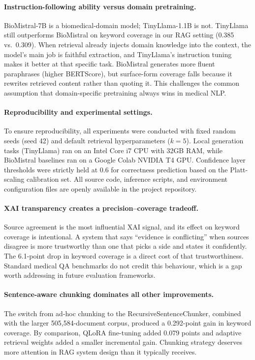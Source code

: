 \documentclass[conference,a4paper]{IEEEtran}
\begin{document}
\paragraph{Instruction-following ability versus domain pretraining.}
BioMistral-7B is a biomedical-domain model; TinyLlama-1.1B is not.
TinyLlama still outperforms BioMistral on keyword coverage in our RAG
setting (0.385 vs.\ 0.309).
When retrieval already injects domain knowledge into the context, the
model's main job is faithful extraction, and TinyLlama's instruction
tuning makes it better at that specific task.
BioMistral generates more fluent paraphrases (higher BERTScore), but
surface-form coverage falls because it rewrites retrieved content rather
than quoting it.
This challenges the common assumption that domain-specific pretraining
always wins in medical NLP.

\paragraph{Reproducibility and experimental settings.}
To ensure reproducibility, all experiments were conducted with fixed
random seeds (seed 42) and default retrieval hyperparameters ($k=5$).
Local generation tasks (TinyLlama) ran on an Intel Core i7 CPU with 32GB
RAM, while BioMistral baselines ran on a Google Colab NVIDIA T4 GPU.
Confidence layer thresholds were strictly held at 0.6 for correctness
prediction based on the Platt-scaling calibration set. All source code,
inference scripts, and environment configuration files are openly 
available in the project repository.

\paragraph{XAI transparency creates a precision--coverage tradeoff.}
Source agreement is the most influential XAI signal, and its effect on
keyword coverage is intentional.
A system that says ``evidence is conflicting'' when sources disagree is
more trustworthy than one that picks a side and states it confidently.
The 6.1-point drop in keyword coverage is a direct cost of that
trustworthiness.
Standard medical QA benchmarks do not credit this behaviour, which is
a gap worth addressing in future evaluation frameworks.

\paragraph{Sentence-aware chunking dominates all other improvements.}
The switch from ad-hoc chunking to the RecursiveSentenceChunker, combined
with the larger 505,584-document corpus, produced a 0.292-point gain in
keyword coverage.
By comparison, QLoRA fine-tuning added 0.079 points and adaptive retrieval
weights added a smaller incremental gain.
Chunking strategy deserves more attention in RAG system design than it
typically receives.
\end{document}

